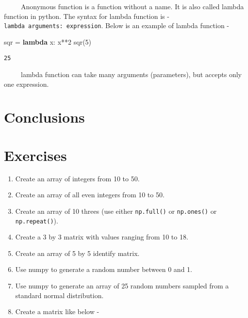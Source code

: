 \documentclass[
  letterpaper,
  DIV=11,
  numbers=noendperiod]{scrreprt}
\newenvironment{Shaded}{\begin{snugshade}}{\end{snugshade}}
\newcommand{\DecValTok}[1]{\textcolor[rgb]{0.68,0.00,0.00}{#1}}
\newcommand{\KeywordTok}[1]{\textcolor[rgb]{0.00,0.23,0.31}{\textbf{#1}}}
\newcommand{\NormalTok}[1]{\textcolor[rgb]{0.00,0.23,0.31}{#1}}
\newcommand{\OperatorTok}[1]{\textcolor[rgb]{0.37,0.37,0.37}{#1}}
\begin{document}
~~~~~Anonymous function is a function without a name. It is also called
lambda function in python. The syntax for lambda function is -
\texttt{lambda\ arguments:\ expression}. Below is an example of lambda
function -

\begin{Shaded}
\begin{Highlighting}[]
\NormalTok{sqr }\OperatorTok{=} \KeywordTok{lambda}\NormalTok{ x: x}\OperatorTok{**}\DecValTok{2}
\NormalTok{sqr(}\DecValTok{5}\NormalTok{)}
\end{Highlighting}
\end{Shaded}

\begin{verbatim}
25
\end{verbatim}

~~~~~lambda function can take many arguments (parameters), but accepts
only one expression.

\section{Conclusions}\label{conclusions-2}

\section*{Exercises}\label{exercises-2}


\begin{enumerate}
\def\labelenumi{\arabic{enumi}.}
\item
  Create an array of integers from 10 to 50.
\item
  Create an array of all even integers from 10 to 50.
\item
  Create an array of 10 threes (use either \texttt{np.full()} or
  \texttt{np.ones()} or \texttt{np.repeat()}).
\item
  Create a 3 by 3 matrix with values ranging from 10 to 18.
\item
  Create an array of 5 by 5 identify matrix.
\item
  Use numpy to generate a random number between 0 and 1.
\item
  Use numpy to generate an array of 25 random numbers sampled from a
  standard normal distribution.
\item
  Create a matrix like below -
\end{enumerate}
\end{document}
